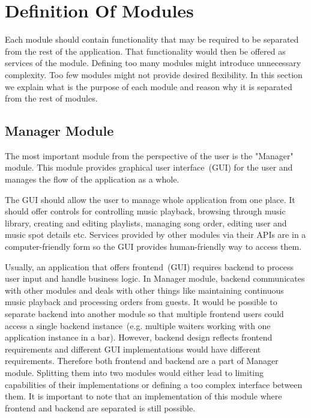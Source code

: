 \section{Definition Of Modules}

Each module should contain functionality that may be required to be separated from the rest of the application. That functionality would then be offered as services of the module. Defining too many modules might introduce unnecessary complexity. Too few modules might not provide desired flexibility. In this section we explain what is the purpose of each module and reason why it is separated from the rest of modules.

\subsection{Manager Module}

The most important module from the perspective of the user is the "Manager" module. This module provides graphical user interface~(GUI) for the user and manages the flow of the application as a whole.
\par
The GUI should allow the user to manage whole application from one place. It should offer controls for controlling music playback, browsing through music library, creating and editing playlists, managing song order, editing user and music spot details etc. Services provided by other modules via their APIs are in a computer-friendly form so the GUI provides human-friendly way to access them.
\par
Usually, an application that offers frontend~(GUI) requires backend to process user input and handle business logic. In Manager module, backend communicates with other modules and deals with other things like maintaining continuous music playback and processing orders from guests. It would be possible to separate backend into another module so that multiple frontend users could access a single backend instance~(e.g. multiple waiters working with one application instance in a bar). However, backend design reflects frontend requirements and different GUI implementations would have different requirements. Therefore both frontend and backend are a part of Manager module. Splitting them into two modules would either lead to limiting capabilities of their implementations or defining a too complex interface between them. It is important to note that an implementation of this module where frontend and backend are separated is still possible.

